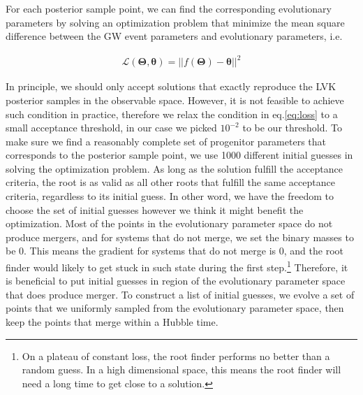 \documentclass[twocolumn]{aastex631}
\begin{document}
For each posterior sample point, we can find the corresponding evolutionary parameters by solving an optimization problem that minimize the mean square difference between the GW event parameters and evolutionary parameters, i.e. 

\begin{align}
\mathcal{L}(\bm{\Theta},\bm{\theta}) = ||f(\bm{\Theta})-\bm{\theta}||^2
\label{eq:loss}
\end{align}

In principle, we should only accept solutions that exactly reproduce the LVK posterior samples in the observable space.
However, it is not feasible to achieve such condition in practice, therefore we relax the condition in eq.\ref{eq:loss} to a small acceptance threshold, in our case we picked $10^{-2}$ to be our threshold.
To make sure we find a reasonably complete set of progenitor parameters that corresponds to the posterior sample point, we use 1000 different initial guesses in solving the optimization problem.
As long as the solution fulfill the acceptance criteria, the root is as valid as all other roots that fulfill the same acceptance criteria, regardless to its initial guess.
In other word, we have the freedom to choose the set of initial guesses however we think it might benefit the optimization.
Most of the points in the evolutionary parameter space do not produce mergers, and for systems that do not merge, we set the binary masses to be 0.
This means the gradient for systems that do not merge is 0, and the root finder would likely to get stuck in such state during the first step.\footnote{On a plateau of constant loss, the root finder performs no better than a random guess. In a high dimensional space, this means the root finder will need a long time to get close to a solution.}
Therefore, it is beneficial to put initial guesses in region of the evolutionary parameter space that does produce merger.
To construct a list of initial guesses, we evolve a set of points that we uniformly sampled from the evolutionary parameter space, then keep the points that merge within a Hubble time.
\end{document}
